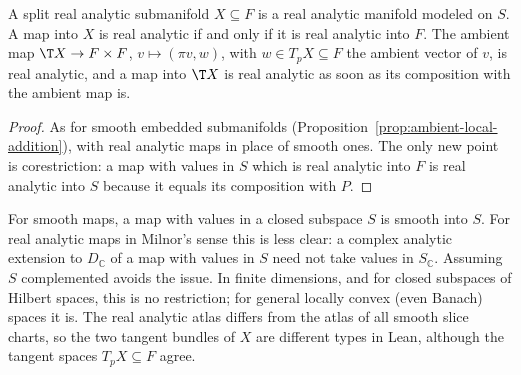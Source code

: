 \begin{theorem}
  \label{thm:split-analytic-submanifold}
  \leanok
  A split real analytic submanifold $X \subseteq F$ is a real analytic manifold modeled on $S$. A
  map into $X$ is real analytic if and only if it is real analytic into $F$. The ambient map
  $\T X \to F \times F$, $v \mapsto (\pi v, w)$, with $w \in T_p X \subseteq F$ the ambient vector of
  $v$, is real analytic, and a map into $\T X$ is real analytic as soon as its composition with the
  ambient map is.
\end{theorem}

\begin{proof}
  \leanok
  As for smooth embedded submanifolds (Proposition~\ref{prop:ambient-local-addition}), with
  real analytic maps in place of smooth ones. The only new point is corestriction: a map with
  values in $S$ which is real analytic into $F$ is real analytic into $S$ because it equals its
  composition with $P$.
\end{proof}

\begin{remark}
  For smooth maps, a map with values in a closed subspace $S$ is smooth into $S$. For real analytic
  maps in Milnor's sense this is less clear: a complex analytic extension to $D_{\mathbb{C}}$ of a
  map with values in $S$ need not take values in $S_{\mathbb{C}}$. Assuming $S$ complemented avoids
  the issue. In finite dimensions, and for closed subspaces of Hilbert spaces, this is no
  restriction; for general locally convex (even Banach) spaces it is. The real analytic atlas
  differs from the atlas of all smooth slice charts, so the two tangent bundles of $X$ are
  different types in Lean, although the tangent spaces $T_pX \subseteq F$ agree.
\end{remark}

